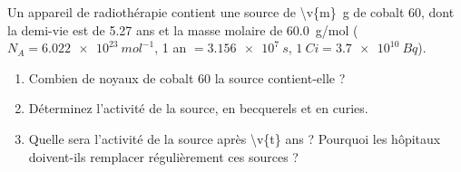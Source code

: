 Un appareil de radiothérapie contient une source de \qty{\v{m}}{g} de cobalt 60, dont la demi-vie est de \num{5.27} ans et la masse molaire de \qty{60.0}{g/mol} ($N_A = \qty{6.022e23}{mol^{-1}}$, 1 an $= \qty{3.156e7}{s}$, $\qty{1}{Ci} = \qty{3.7e10}{Bq}$).

\begin{enumerate}[label=\alph*)]
    \item Combien de noyaux de cobalt 60 la source contient-elle ?
    \item Déterminez l'activité de la source, en becquerels et en curies.
    \item Quelle sera l'activité de la source après \num{\v{t}} ans ? Pourquoi les hôpitaux doivent-ils remplacer régulièrement ces sources ?
\end{enumerate}
